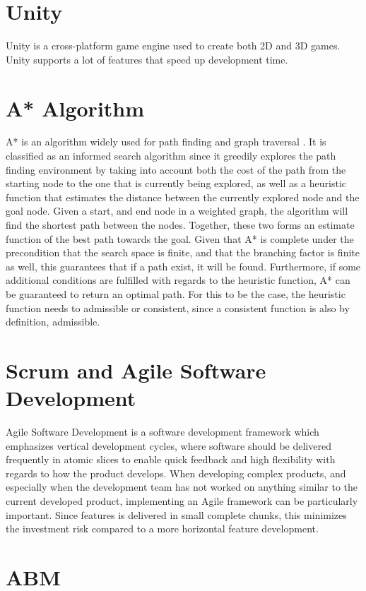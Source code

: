 

\section{Unity}
Unity is a cross-platform game engine used to create both 2D and 3D games. Unity supports a lot of features that speed up development time. 



\section{A* Algorithm}
    A* is an algorithm widely used for path finding and graph traversal \cite{A-Star-Algorithm}. It is classified as an informed search algorithm since it greedily explores the path finding environment by taking into account both the cost of the path from the starting node to the one that is currently being explored, as well as a heuristic function that estimates the distance between the currently explored node and the goal node. Given a start, and end node in a weighted graph, the algorithm will find the shortest path between the nodes. Together, these two forms an estimate function of the best path towards the goal. Given that A* is complete under the precondition that the search space is finite, and that the branching factor is finite as well, this guarantees that if a path exist, it will be found. Furthermore, if some additional conditions are fulfilled with regards to the heuristic function, A* can be guaranteed to return an optimal path. For this to be the case, the heuristic function needs to admissible or consistent, since a consistent function is also by definition, admissible. 



\section{Scrum and Agile Software Development}
Agile Software Development is a software development framework which emphasizes vertical development cycles, where software should be delivered frequently in atomic slices to enable quick feedback and high flexibility with regards to how the product develops. When developing complex products, and especially when the development team has not worked on anything similar to the current developed product, implementing an Agile framework can be particularly important. Since features is delivered in small complete chunks, this minimizes the investment risk compared to a more horizontal feature development. 

\section{ABM}

